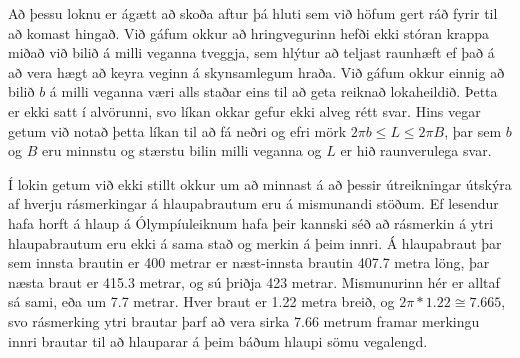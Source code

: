 \documentclass[10pt,a4paper]{amsart}
\begin{document}
	Að þessu loknu er ágætt að skoða aftur þá hluti sem við höfum gert ráð fyrir
	til að komast hingað. Við gáfum okkur að hringvegurinn hefði ekki stóran krappa
	miðað við bilið á milli veganna tveggja, sem hlýtur að teljast raunhæft ef það
	á að vera hægt að keyra veginn á skynsamlegum hraða. Við gáfum okkur einnig að
	bilið $b$ á milli veganna væri alls staðar eins til að geta reiknað lokaheildið. Þetta er
	ekki satt í alvörunni, svo líkan okkar gefur ekki alveg rétt svar. Hins vegar
	getum við notað þetta líkan til að fá neðri og efri mörk $2\pi b \leq L \leq
	2\pi B$, þar sem $b$ og $B$ eru minnstu og stærstu bilin milli veganna og $L$
	er hið raunverulega svar.

	Í lokin getum við ekki stillt okkur um að minnast á að þessir útreikningar
	útskýra af hverju rásmerkingar á hlaupabrautum eru á mismunandi stöðum. Ef
	lesendur hafa horft á hlaup á Ólympíuleiknum hafa þeir kannski séð að rásmerkin
	á ytri hlaupabrautum eru ekki á sama stað og merkin á þeim innri. Á hlaupabraut
	þar sem innsta brautin er 400 metrar er næst-innsta brautin 407.7 metra löng,
	þar næsta braut er 415.3 metrar, og sú þriðja 423 metrar. Mismunurinn hér er
	alltaf sá sami, eða um 7.7 metrar. Hver braut er 1.22 metra breið, og $2\pi *
	1.22 \cong 7.665$, svo rásmerking ytri brautar þarf að vera sirka 7.66 metrum
	framar merkingu innri brautar til að hlauparar á þeim báðum hlaupi sömu
	vegalengd.

	
\end{document}
